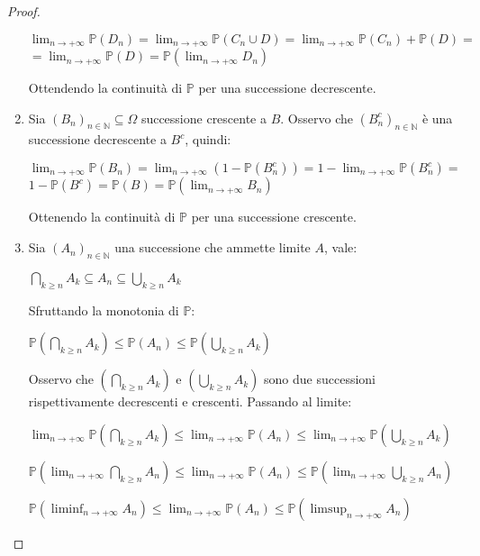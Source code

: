 \begin{theorem}
\begin{proof}
\begin{enumerate}
\begin{center}
    $\lim_{n\to+\infty}\mathbb{P}(D_n)=\lim_{n\to+\infty}\mathbb{P}(C_n\cup D)=\lim_{n\to+\infty}\mathbb{P}(C_n)+\mathbb{P}(D)=$
\vspace{7px}    
\newline
    $=\lim_{n\to+\infty}\mathbb{P}(D)=\mathbb{P}(\lim_{n\to+\infty}D_n)$
\end{center}
Ottendendo la continuità di $\mathbb{P}$ per una successione decrescente.
\item Sia $(B_n)_{n\in\mathbb{N}}\subseteq\Omega$ successione crescente a $B$. Osservo che $(B_n^c)_{n\in\mathbb{N}}$ è una successione decrescente a $B^c$, quindi:
\begin{center}
         $\lim_{n\to+\infty}\mathbb{P}(B_n)=\lim_{n\to+\infty}(1-\mathbb{P}(B_n^c))=1-\lim_{n\to+\infty}\mathbb{P}(B_n^c)=$
         \vspace{7px}
         \newline
         $1-\mathbb{P}(B^c)=\mathbb{P}(B)=\mathbb{P}(\lim_{n\to+\infty}B_n)$
\end{center}
Ottenendo la continuità di $\mathbb{P}$ per una successione crescente.
\item Sia $(A_n)_{n\in\mathbb{N}}$ una successione che ammette limite $A$, vale:
\begin{center}
    $\bigcap\limits_{k\geq n}A_k\subseteq A_n\subseteq\bigcup\limits_{k\geq n}A_k$
\end{center}
Sfruttando la monotonia di $\mathbb{P}$:
\begin{center}
    $\mathbb{P}(\bigcap\limits_{k\geq n}A_k)\leq\mathbb{P}(A_n)\leq\mathbb{P}(\bigcup\limits_{k\geq n}A_k)$
\end{center}
Osservo che $(\bigcap\limits_{k\geq n}A_k)$ e $(\bigcup\limits_{k\geq n}A_k)$ sono due successioni rispettivamente decrescenti e crescenti. Passando al limite:
\begin{center}
    $\lim_{n\to +\infty}\mathbb{P}(\bigcap\limits_{k\geq n}A_k)\leq\lim_{n\to +\infty}\mathbb{P}(A_n)\leq\lim_{n\to +\infty}\mathbb{P}(\bigcup\limits_{k\geq n}A_k)$
\end{center}
\begin{center}
    $\mathbb{P}(\lim_{n\to +\infty}\bigcap\limits_{k\geq n}A_n)\leq\lim_{n\to +\infty}\mathbb{P}(A_n)\leq\mathbb{P}(\lim_{n\to +\infty}\bigcup\limits_{k\geq n}A_n)$
\end{center}
\begin{center}
    $\mathbb{P}(\liminf_{n\to +\infty}A_n)\leq\lim_{n\to +\infty}\mathbb{P}(A_n)\leq\mathbb{P}(\limsup_{n\to +\infty}A_n)$

\end{center}
\end{enumerate}
\end{proof}
\end{theorem}
